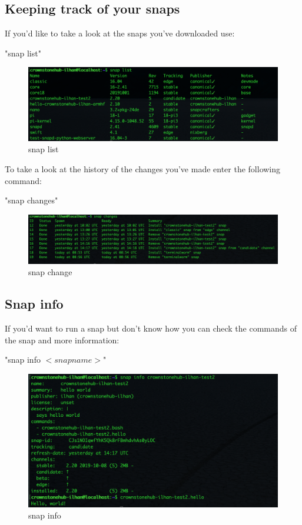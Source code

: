 \documentclass{article}
\begin{document}
\begin{flushleft}
\subsection{Keeping track of your snaps}\label{sec:keeptrack}
If you'd like to take a look at the snaps you've downloaded use:\\
			\begin{center}				
			"snap list"
			\end{center}
\label{fig:snapList}	
	\begin{figure}[H]
	\includegraphics[width=5in]{snapList.png}
	\caption[Optional caption]{snap list}
	\end{figure}
To take a look at the history of the changes you've made enter the following command: 
			\begin{center}				
			"snap changes"
			\end{center}
\label{fig:snapChange}	
	\begin{figure}[H]
	\includegraphics[width=5in]{snapChange.png}
	\caption[Optional caption]{snap change}
	\end{figure}
\cleardoublepage
\subsection{Snap info}\label{sec:info}
If you'd want to run a snap but don't know how you can check the commands of the snap and more information: \\
			\begin{center}				
			"snap info $<snap name>$"
			\end{center}
\label{fig:snapInfo}	
	\begin{figure}[H]
	\includegraphics[width=5in]{snapInfo.png}
	\caption[Optional caption]{snap info}
	\end{figure}
	

\end{flushleft}
\end{document}
